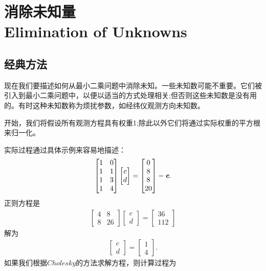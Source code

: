 \section[消除未知量]{消除未知量\\Elimination of Unknowns}
\subsection{经典方法}
现在我们要描述如何从最小二乘问题中消除未知。一些未知数可能不重要。它们被引入到最小二乘问题中，以便以适当的方式处理相关;但否则这些未知数是没有用的。有时这种未知数称为烦扰参数，如经纬仪观测方向未知数。

开始，我们将假设所有观测方程具有权重1;除此以外它们将通过实际权重的平方根来归一化。

实际过程通过具体示例来容易地描述：
\begin{align}
\begin{bmatrix}
1    &    0\\
1    &    1\\
1    &    3\\
1    &    4
\end{bmatrix}
\begin{bmatrix}
c\\
d
\end{bmatrix}  = 
\begin{bmatrix}
0\\
8\\
8\\
20
\end{bmatrix}
- \textbf{\textit{e}}.
\end{align}
正则方程是
\begin{align}
\begin{bmatrix}
4  &  8\\
8  &  26
\end{bmatrix}
\begin{bmatrix}
c\\
d
\end{bmatrix} = 
\begin{bmatrix}
36\\
112
\end{bmatrix}
\end{align}
解为
\begin{align*}
\begin{bmatrix}
c\\
d
\end{bmatrix} =
\begin{bmatrix}
1\\
4
\end{bmatrix}.
\end{align*}
如果我们根据$Cholesky$的方法求解方程，则计算过程为

